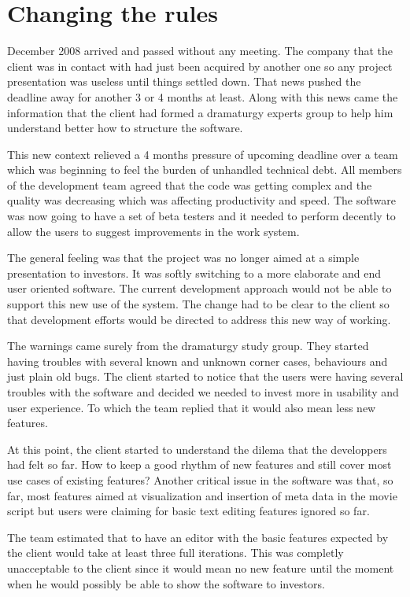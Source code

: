 \documentclass[lnbip]{svmultln}
\begin{document}
\section{Changing the rules}
\label{sec:changes}

December 2008 arrived and passed without any meeting. The company that
the client was in contact with had just been acquired by another one
so any project presentation was useless until things settled
down. That news pushed the deadline away for another 3 or 4 months at
least. Along with this news came the information that the client had
formed a dramaturgy experts group to help him understand better how to
structure the software.

This new context relieved a 4 months pressure of upcoming deadline
over a team which was beginning to feel the burden of unhandled
technical debt. All members of the development team agreed that the
code was getting complex and the quality was decreasing which was
affecting productivity and speed. The software was now going to have a
set of beta testers and it needed to perform decently to allow the
users to suggest improvements in the work system.

The general feeling was that the project was no longer aimed at a
simple presentation to investors. It was softly switching to a more
elaborate and end user oriented software. The current development
approach would not be able to support this new use of the system. The
change had to be clear to the client so that development efforts would
be directed to address this new way of working.

The warnings came surely from the dramaturgy study group. They started
having troubles with several known and unknown corner cases,
behaviours and just plain old bugs. The client started to notice that
the users were having several troubles with the software and decided
we needed to invest more in usability and user experience. To which
the team replied that it would also mean less new features.

At this point, the client started to understand the dilema that the
developpers had felt so far. How to keep a good rhythm of new features
and still cover most use cases of existing features? Another critical
issue in the software was that, so far, most features aimed at
visualization and insertion of meta data in the movie script but users
were claiming for basic text editing features ignored so far.

The team estimated that to have an editor with the basic features
expected by the client would take at least three full iterations. This
was completly unacceptable to the client since it would mean no new
feature until the moment when he would possibly be able to show the
software to investors.
\end{document}
